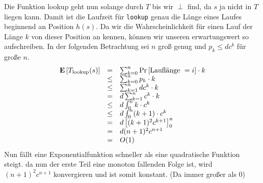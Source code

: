 \documentclass[11pt,a4paper,ngerman]{article}
\newcommand{\erw}[1]{\text{\bfseries E} \left[ #1 \right]}
\newcommand{\prob}[1]{\text{Pr}\left[ #1 \right]}
\begin{document}
Die Funktion lookup geht nun solange durch $T$ bis wir $\perp$ find, da $s$ ja nicht in $T$ liegen kann. Damit ist die Laufzeit für \lstinline|lookup| genau die Länge eines Laufes beginnend an Position $h(s)$. Da wir die Wahrscheinlichkeit für einen Lauf der Länge $k$ von dieser Position an kennen, können wir unseren erwartungswert so aufschreiben. In der folgenden Betrachtung sei $n$ groß genug und $p_k \leq d c^k$ für große $n$.
$$\begin{array}{rcl}
	\erw{T_\text{lookup}(s)} &=& \sum_{k=0}^n \prob{\text{Lauflänge }=i} \cdot k\\
					&\leq& \sum_{k=0}^n p_k \cdot k\\
					&\leq& \sum_{k=1}^n d c^k\cdot k\\
					&=& d \sum_{k=1}^n c^k \cdot k\\
					&\leq& d\int_0^{n} k \cdot c^k\\
					&\leq& d\int_0^{n} (k+1) \cdot c^k\\
					&=& d\left[ (k+1)^2 c^{k+1} \right]_0^{n}\\
					&=& d(n+1)^2 c^{n+1}\\
					&=& O(1)
\end{array}$$
Nun fällt eine Exponentialfunktion schneller als eine quadratische Funktion steigt. da nun der erste Teil eine monoton fallenden Folge ist, wird 
$(n+1)^2 c^{n+1}$ konvergieren und ist somit konstant. (Da immer großer als 0)
\label{LastPage}
\end{document}

